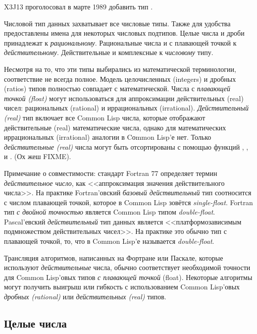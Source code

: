 \begin{newer}
X3J13 проголосовал в марте 1989  добавить тип .

Числовой тип данных захватывает все числовые типы. Также для
удобства предоставлены имена для некоторых числовых
подтипов. Целые числа и дроби принадлежат к
\emph{рациональному}. Рациональные числа и с плавающей точкой к
\emph{действительному}. Действительные и комплексные к \emph{числовому} типу.

Несмотря на то, что эти типы выбирались из математической
терминологии, соответствие не всегда полное. Модель целочисленных
(integers) и дробных (ratios) типов полностью совпадает с
математической. Числа с \emph{плавающей точкой (float)} могут
использоваться для аппроксимации действительных (real) чисел:
рациональных (rational) и иррациональных
(irrational). \emph{Действительный (real)} тип включает все Common Lisp
числа, которые отображают действительные (real) математические числа,
однако для математических иррациональных (irrational) аналогии в Cоmmon Lisp'е
нет. Только \emph{действительные (real)} числа могут быть отсортированы с
помощью функций \cdf{<}, \cdf{>}, \cdf{<=} и \cdf{>=}. (Ох жеш FIXME). 

\beforenoterule
\begin{incompatibility}
Примечание о совместимости: стандарт Fortran 77 определяет термин
\emph{действительное число}, как <<аппроксимация значения действительного
числа>>. На практике Fortran'овский \emph{базовый действительный} тип
соотносится с числом плавающей точкой, которое в Common Lisp
зовётся \emph{single-float}. Fortran тип \emph{с двойной точностью} является
Common Lisp типом \emph{double-float}. Pascal'евский \emph{действительный} тип
данных является <<платформозависимым подмножеством действительных
чисел>>. На практике это обычно тип с плавающей точкой, то, что в
Common Lisp'е называется \emph{double-float}. 

Трансляция алгоритмов, написанных на Фортране или Паскале, которые
используют \emph{действительные} числа, обычно соответствует необходимой
точности для Common Lisp'овых типов \emph{с плавающей точкой}
(float). Некоторые алгоритмы могут получить выигрыш или гибкость с
использованием Common Lisp'овых \emph{дробных (rational)} или
\emph{действительных (real)} типов. 
\end{incompatibility}
\afternoterule
\end{newer}

\subsection{Целые числа}
\label{INTEGERS-SECTION}


